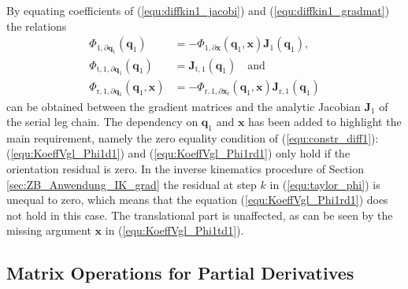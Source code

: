 \documentclass[robotics,article,accept,moreauthors,pdftex]{Definitions/mdpi}
\newcommand{\bm}[1]{\boldsymbol{#1}}
\let\Phi\varPhi
\begin{document}
By equating coefficients of (\ref{equ:diffkin1_jacobi}) and (\ref{equ:diffkin1_gradmat}) the relations
%
\begin{align}
\bm{\Phi}_{1,\partial\bm{q}_1}(\bm{q}_1)
&=
-\bm{\Phi}_{1,\partial\bm{x}}(\bm{q}_1,\bm{x})
\bm{J}_1(\bm{q}_1),
\label{equ:KoeffVgl_Phi1d1}
\\
\bm{\Phi}_{\mathrm{t},1,\partial\bm{q}_1}(\bm{q}_1)
&=
\bm{J}_{\mathrm{t},1}(\bm{q}_1)\quad\mathrm{and}
\label{equ:KoeffVgl_Phi1td1}
\\
\bm{\Phi}_{\mathrm{r},1,\partial\bm{q}_1}(\bm{q}_1,\bm{x})
&=
-\bm{\Phi}_{\mathrm{r},1,\partial\bm{x}_\mathrm{r}}(\bm{q}_1,\bm{x}) \bm{J}_{\mathrm{r},1}(\bm{q}_1)
\label{equ:KoeffVgl_Phi1rd1}
\end{align}
%
can be obtained between the gradient matrices and the analytic Jacobian $\bm{J}_1$ of the serial leg chain.
The dependency on $\bm{q}_1$ and $\bm{x}$ has been added to highlight the main requirement, namely the zero equality condition of (\ref{equ:constr_diff1}):  (\ref{equ:KoeffVgl_Phi1d1}) and (\ref{equ:KoeffVgl_Phi1rd1}) only hold if the orientation residual is zero.
In the inverse kinematics procedure of Section\,\ref{sec:ZB_Anwendung_IK_grad} the residual at step $k$ in (\ref{equ:taylor_phi}) is unequal to zero, which means that the equation (\ref{equ:KoeffVgl_Phi1rd1}) does not hold in this case.
The translational part is unaffected, as can be seen by the missing argument $\bm{x}$ in (\ref{equ:KoeffVgl_Phi1td1}).

\subsection{Matrix Operations for Partial Derivatives}
\label{sec:appendix_gradient_matrix}
\end{document}
